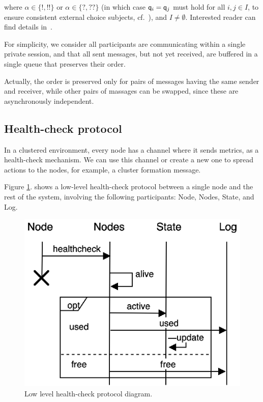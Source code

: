 where $\alpha\in\{{!}, {!!}\}$ or  $\alpha\in\{{?}, {??}\}$ (in which case ${\sf q}_i={\sf q}_j$ must hold for all $i,j \in I$, to ensure consistent external choice subjects, cf.~\cite[Page 6.]{HuY17}), and $I\not=\emptyset$.
Interested reader can find details in~\cite{HuY17}.

For simplicity, we consider all participants are communicating within a single private session, and that all sent messages, but not yet received, are buffered in a single queue that preserves their order. 

Actually, the order is preserved only for pairs of messages having the same sender and receiver, while other pairs of massages can be swapped, since these are asynchronously independent.
%
%
\subsection{Health-check protocol}\label{sec:health_check_protocol}
%
In a clustered environment, every node has a channel where it sends metrics, as a health-check mechanism. We can use this channel or create a new one to spread actions to the nodes, for example, a cluster formation message. 

Figure \ref{fig:fig6}. shows a low-level health-check protocol between a single node and the rest of the system, involving the following participants: Node, Nodes, State, and Log.

\begin{figure}[H]
	\begin{center}
		\includegraphics[scale=0.75]{images/FIG2}
	\end{center}
	\vspace{-0.7cm}
	\caption{Low level health-check protocol diagram.}
	\label{fig:fig6}
\end{figure} 

